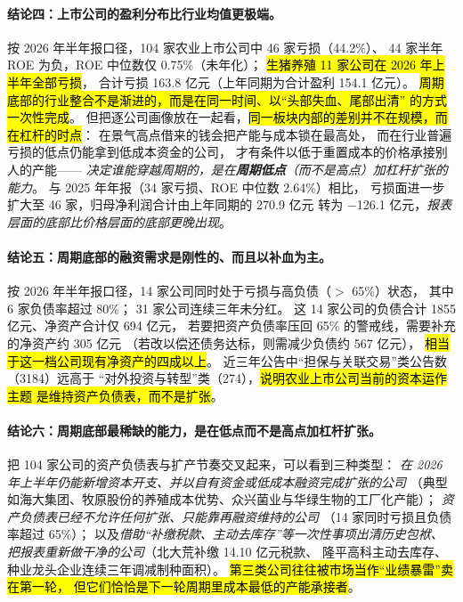 \paragraph{结论四：上市公司的盈利分布比行业均值更极端。}
按 2026 年半年报口径，\num{104} 家农业上市公司中 \num{46} 家亏损（\num{44.2}\%）、
\num{44} 家半年 ROE 为负，ROE 中位数仅 \num{0.75}\%（未年化）；
\hl{生猪养殖 \num{11} 家公司在 2026 年上半年全部亏损}，
合计亏损 \num{163.8} 亿元（上年同期为合计盈利 \num{154.1} 亿元）。
\hl{周期底部的行业整合不是渐进的，而是在同一时间、以“头部失血、尾部出清”
的方式一次性完成}。
但把逐公司画像放在一起看，\hl{同一板块内部的差别并不在规模，而在杠杆的时点}：
在景气高点借来的钱会把产能与成本锁在最高处，
而在行业普遍亏损的低点仍能拿到低成本资金的公司，
才有条件以低于重置成本的价格承接别人的产能——
\emph{决定谁能穿越周期的，是在\textbf{周期低点}（而不是高点）加杠杆扩张的能力}。
与 2025 年年报（\num{34} 家亏损、ROE 中位数 \num{2.64}\%）相比，
亏损面进一步扩大至 \num{46} 家，归母净利润合计由上年同期的 \num{+270.9} 亿元
转为 \num{-126.1} 亿元，\emph{报表层面的底部比价格层面的底部更晚出现}。

\paragraph{结论五：周期底部的融资需求是刚性的、而且以补血为主。}
按 2026 年半年报口径，\num{14} 家公司同时处于亏损与高负债（$>$ \num{65}\%）状态，
其中 \num{6} 家负债率超过 \num{80}\%；
\num{31} 家公司连续三年未分红。
这 \num{14} 家公司的负债合计 \num{1855} 亿元、净资产合计仅 \num{694} 亿元，
若要把资产负债率压回 \num{65}\% 的警戒线，需要补充的净资产约 \num{305} 亿元
（若改以偿还债务达标，则需减少负债约 \num{567} 亿元），
\hl{相当于这一档公司现有净资产的四成以上}。
近三年公告中“担保与关联交易”类公告数（\num{3184}）远高于
“对外投资与转型”类（\num{274}），\hl{说明农业上市公司当前的资本运作主题
是维持资产负债表，而不是扩张}。

\paragraph{结论六：周期底部最稀缺的能力，是在低点而不是高点加杠杆扩张。}
把 \num{104} 家公司的资产负债表与扩产节奏交叉起来，可以看到三种类型：
\emph{在 2026 年上半年仍能新增资本开支、并以自有资金或低成本融资完成扩张的公司}
（典型如海大集团、牧原股份的养殖成本优势、众兴菌业与华绿生物的工厂化产能）；
\emph{资产负债表已经不允许任何扩张、只能靠再融资维持的公司}
（\num{14} 家同时亏损且负债率超过 \num{65}\%）；
以及\emph{借助“补缴税款、主动去库存”等一次性事项出清历史包袱、
把报表重新做干净的公司}（北大荒补缴 \num{14.10} 亿元税款、
隆平高科主动去库存、种业龙头企业连续三年调减制种面积）。
\hl{第三类公司往往被市场当作“业绩暴雷”卖在第一轮，
但它们恰恰是下一轮周期里成本最低的产能承接者}。


